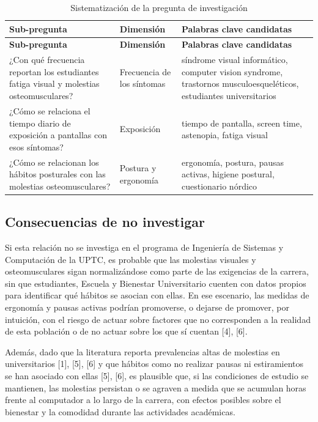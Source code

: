 \bigskip
\begin{center}
\begin{longtable}{L{6.2cm} L{3.4cm} L{4.8cm}}
\caption{Sistematización de la pregunta de investigación} \\
\toprule
\textbf{Sub-pregunta} & \textbf{Dimensión} & \textbf{Palabras clave candidatas} \\
\midrule
\endfirsthead
\toprule
\textbf{Sub-pregunta} & \textbf{Dimensión} & \textbf{Palabras clave candidatas} \\
\midrule
\endhead
¿Con qué frecuencia reportan los estudiantes fatiga visual y molestias osteomusculares? & Frecuencia de los síntomas & síndrome visual informático, computer vision syndrome, trastornos musculoesqueléticos, estudiantes universitarios \\
\midrule
¿Cómo se relaciona el tiempo diario de exposición a pantallas con esos síntomas? & Exposición & tiempo de pantalla, screen time, astenopia, fatiga visual \\
\midrule
¿Cómo se relacionan los hábitos posturales con las molestias osteomusculares? & Postura y ergonomía & ergonomía, postura, pausas activas, higiene postural, cuestionario nórdico \\
\bottomrule
\end{longtable}
\end{center}

\subsection{Consecuencias de no investigar}

Si esta relación no se investiga en el programa de Ingeniería de Sistemas y Computación
de la UPTC, es probable que las molestias visuales y osteomusculares sigan
normalizándose como parte de las exigencias de la carrera, sin que estudiantes, Escuela
y Bienestar Universitario cuenten con datos propios para identificar qué hábitos se
asocian con ellas. En ese escenario, las medidas de ergonomía y pausas activas podrían
promoverse, o dejarse de promover, por intuición, con el riesgo de actuar sobre factores
que no corresponden a la realidad de esta población o de no actuar sobre los que sí
cuentan [4], [6].

Además, dado que la literatura reporta prevalencias altas de molestias en universitarios
[1], [5], [6] y que hábitos como no realizar pausas ni estiramientos se han asociado con
ellas [5], [6], es plausible que, si las condiciones de estudio se mantienen, las
molestias persistan o se agraven a medida que se acumulan horas frente al computador a
lo largo de la carrera, con efectos posibles sobre el bienestar y la comodidad durante
las actividades académicas.

